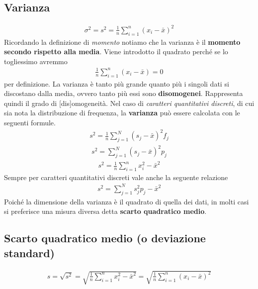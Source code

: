 \subsection{Varianza}
\begin{align}
\sigma^2 = s^2 = \frac{1}{n} \sum_{i = 1}^{n} (x_i - \bar{x})^2
\end{align}
Ricordando la definizione di \textit{momento} notiamo che la varianza è il \textbf{momento secondo rispetto alla media}.
Viene introdotto il quadrato perché se lo togliessimo avremmo
\begin{align}
\frac{1}{n} \sum_{i = 1}^{n} (x_i - \bar{x}) = 0
\end{align}
per definizione.
La varianza è tanto più grande quanto più i singoli dati si discostano dalla media, ovvero tanto più essi sono \textbf{disomogenei}. Rappresenta quindi il grado di [dis]omogeneità. \newline
Nel caso di \textit{caratteri quantitativi discreti}, di cui sia nota la distribuzione di frequenza, la \textbf{varianza} può essere calcolata con le seguenti formule.
\begin{align}
s^2 = \frac{1}{n} \sum_{j = 1}^{N} (s_j - \bar{x})^2 f_j
\end{align}
\begin{align}
s^2 =  \sum_{j = 1}^{N} (s_j - \bar{x})^2 p_j
\end{align}
\begin{align}
s^2 = \frac{1}{n} \sum_{i = 1}^{n} x_i^2 - \bar{x}^2
\end{align}
Sempre per caratteri quantitativi discreti vale anche la seguente relazione
\begin{align}
s^2 =  \sum_{j = 1}^{N} s_j^2 p_j - \bar{x}^2
\end{align}
Poiché la dimensione della varianza è il quadrato di quella dei dati, in molti casi si preferisce una misura diversa detta \textbf{scarto quadratico medio}.

\subsection{Scarto quadratico medio (o deviazione standard)}
\begin{align}
s = \sqrt{s^2} = \sqrt{\frac{1}{n} \sum_{i = 1}^{n} x_i^2 - \bar{x}^2} =  \sqrt{\frac{1}{n} \sum_{i = 1}^{n} (x_i - \bar{x})^2}
\end{align}

